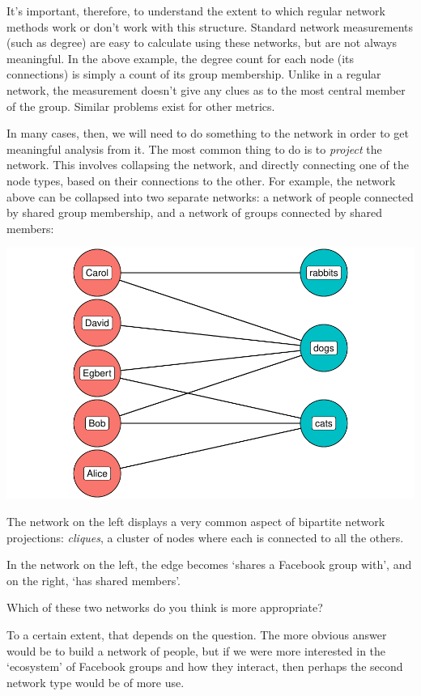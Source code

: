 \documentclass[
]{book}
\begin{document}
It's important, therefore, to understand the extent to which regular network methods work or don't work with this structure. Standard network measurements (such as degree) are easy to calculate using these networks, but are not always meaningful. In the above example, the degree count for each node (its connections) is simply a count of its group membership. Unlike in a regular network, the measurement doesn't give any clues as to the most central member of the group. Similar problems exist for other metrics.

In many cases, then, we will need to do something to the network in order to get meaningful analysis from it. The most common thing to do is to \emph{project} the network. This involves collapsing the network, and directly connecting one of the node types, based on their connections to the other. For example, the network above can be collapsed into two separate networks: a network of people connected by shared group membership, and a network of groups connected by shared members:

\includegraphics{_main_files/figure-latex/unnamed-chunk-69-1.pdf}

The network on the left displays a very common aspect of bipartite network projections: \emph{cliques}, a cluster of nodes where each is connected to all the others.

In the network on the left, the edge becomes `shares a Facebook group with', and on the right, `has shared members'.

Which of these two networks do you think is more appropriate?

To a certain extent, that depends on the question. The more obvious answer would be to build a network of people, but if we were more interested in the `ecosystem' of Facebook groups and how they interact, then perhaps the second network type would be of more use.
\end{document}
